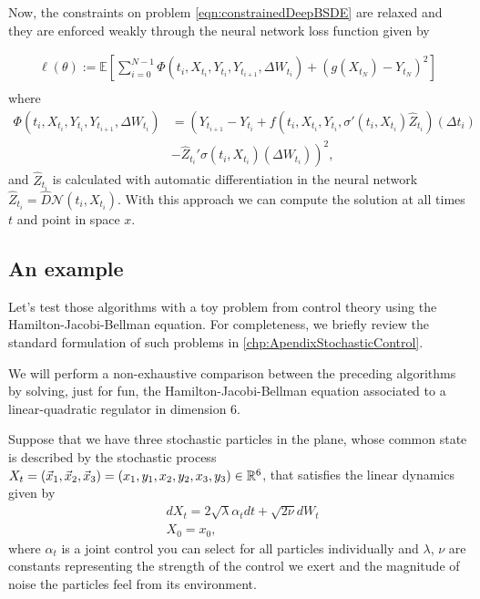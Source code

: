 Now, the constraints on problem \eqref{eqn:constrainedDeepBSDE} are relaxed and they are enforced weakly through the neural network loss function given by

\begin{equation}
	\begin{gathered}
		\ell(\theta):=\mathbb{E}\left[\sum_{i=0}^{N-1} \Phi\left(t_i, X_{t_i}, Y_{t_i}, Y_{t_{i+1}}, \Delta W_{t_{i}}\right)+\left(g\left(X_{t_N}\right)-Y_{t_N}\right)^2\right] \\
	\end{gathered}
\end{equation}
where 
\begin{equation}
	\begin{split}
		\Phi\left(t_i, X_{t_i}, Y_{t_i}, Y_{t_{i+1}}, \Delta W_{t_i}\right)&=\left(Y_{t_{i+1}}-Y_{t_i}+f\left(t_i, X_{t_i}, Y_{t_i}, \sigma'\left(t_i, X_{t_i}\right) \widehat{Z}_{t_i}\right)\left(\Delta t_i\right)\right. \\
		&\left.-\widehat{Z}_{t_i}' \sigma\left(t_i, X_{t_i}\right)\left(\Delta W_{t_i}\right)\right)^2,
	\end{split}
\end{equation}
and $\widehat{Z}_{t_i}$ is calculated with automatic differentiation in the neural network $\widehat{Z}_{t_i}=\hat{D}\mathcal{N}(t_i,X_{t_i})$. With this approach we can compute the solution at all times $t$ and point in space $x$.
\subsection{An example}
\label{subsec:example_LQR}
Let's test those algorithms with a toy problem from control theory using the Hamilton-Jacobi-Bellman equation. For completeness, we briefly review the standard formulation of such problems in \autoref{chp:ApendixStochasticControl}.


We will perform a non-exhaustive comparison between the preceding algorithms by solving, just for fun, the Hamilton-Jacobi-Bellman equation associated to a linear-quadratic regulator in dimension 6.

Suppose that we have three stochastic particles in the plane, whose common state is described by the stochastic process $X_t=(\vec{x}_1,\vec{x}_2,\vec{x}_3)=(x_1,y_1,x_2,y_2,x_3,y_3)\in\mathbb{R}^6$, that satisfies the linear dynamics given by 
\begin{equation}
	\begin{split}
		&dX_t=2\sqrt{\lambda}\alpha_t dt+\sqrt{2\nu}dW_t\\
		&X_0=x_0,
	\end{split} 
\end{equation} 
where $\alpha_t$ is a joint control you can select for all particles individually and $\lambda$, $\nu$ are constants representing the strength of the control we exert and the magnitude of noise the particles feel from its environment.  

